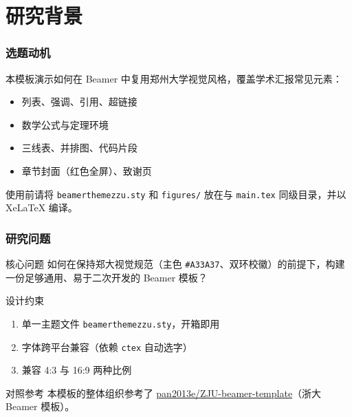 \section{研究背景}

\begin{frame}
  \frametitle{选题动机}
  本模板演示如何在 Beamer 中复用郑州大学视觉风格，覆盖学术汇报常见元素：
  \begin{itemize}
    \item 列表、强调、引用、超链接
    \item 数学公式与定理环境
    \item 三线表、并排图、代码片段
    \item 章节封面（红色全屏）、致谢页
  \end{itemize}
  \pause
  \vspace{0.6em}
  使用前请将 \texttt{beamerthemezzu.sty} 和 \texttt{figures/} 放在与 \texttt{main.tex} 同级目录，并以 \alert{XeLaTeX} 编译。
\end{frame}

\begin{frame}
  \frametitle{研究问题}
  \begin{block}{核心问题}
    如何在保持郑大视觉规范（主色 \texttt{\#A33A37}、双环校徽）的前提下，构建一份足够通用、易于二次开发的 Beamer 模板？
  \end{block}
  \begin{alertblock}{设计约束}
    \begin{enumerate}
      \item 单一主题文件 \texttt{beamerthemezzu.sty}，开箱即用
      \item 字体跨平台兼容（依赖 \texttt{ctex} 自动选字）
      \item 兼容 4:3 与 16:9 两种比例
    \end{enumerate}
  \end{alertblock}
  \begin{exampleblock}{对照参考}
    本模板的整体组织参考了 \href{https://github.com/pan2013e/ZJU-beamer-template}{pan2013e/ZJU-beamer-template}（浙大 Beamer 模板）。
  \end{exampleblock}
\end{frame}

